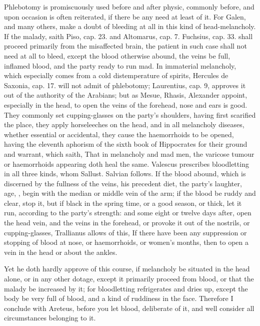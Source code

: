 Phlebotomy is promiscuously used before and after physic, commonly
before, and upon occasion is often reiterated, if there be any need at
least of it. For Galen, and many others, make a doubt of bleeding at
all in this kind of head-melancholy. If the malady, saith Piso, cap.
23. and Altomarus, cap. 7. Fuchsius, cap. 33. shall proceed
primarily from the misaffected brain, the patient in such case shall
not need at all to bleed, except the blood otherwise abound, the veins
be full, inflamed blood, and the party ready to run mad. In immaterial
melancholy, which especially comes from a cold distemperature of
spirits, Hercules de Saxonia, cap. 17. will not admit of phlebotomy;
Laurentius, cap. 9, approves it out of the authority of the Arabians;
but as Mesue, Rhasis, Alexander appoint, especially in the head,
to open the veins of the forehead, nose and ears is good. They commonly
set cupping-glasses on the party's shoulders, having first scarified
the place, they apply horseleeches on the head, and in all melancholy
diseases, whether essential or accidental, they cause the haemorrhoids
to be opened, having the eleventh aphorism of the sixth book of
Hippocrates for their ground and warrant, which saith, That in
melancholy and mad men, the varicose tumour or haemorrhoids appearing
doth heal the same. Valescus prescribes bloodletting in all three
kinds, whom Sallust. Salvian follows. If the blood abound, which
is discerned by the fullness of the veins, his precedent diet, the
party's laughter, age, \etc{}, begin with the median or middle vein of the
arm; if the blood be ruddy and clear, stop it, but if black in the
spring time, or a good season, or thick, let it run, according to the
party's strength: and some eight or twelve days after, open the head
vein, and the veins in the forehead, or provoke it out of the nostrils,
or cupping-glasses, \etc{} Trallianus allows of this, If there have
been any suppression or stopping of blood at nose, or haemorrhoids, or
women's months, then to open a vein in the head or about the ankles.

Yet he doth hardly approve of this course, if melancholy be situated in
the head alone, or in any other dotage, except it primarily
proceed from blood, or that the malady be increased by it; for
bloodletting refrigerates and dries up, except the body be very full of
blood, and a kind of ruddiness in the face. Therefore I conclude with
Areteus, before you let blood, deliberate of it, and well
consider all circumstances belonging to it.

